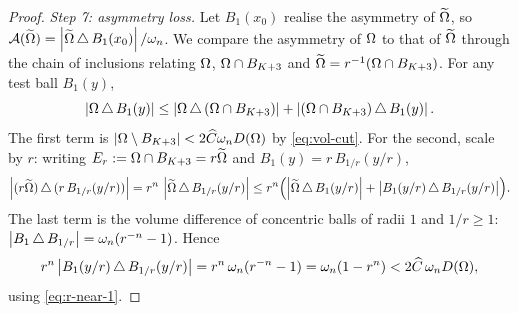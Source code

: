 \begin{proof}
\smallskip
\emph{Step 7: asymmetry loss.}
Let $B_1(x_0)$ realise the asymmetry of $\widetilde{\Omega}$, so
$\mathcal A(\widetilde{\Omega})=\left|\widetilde{\Omega}\,\triangle\,B_1(x_0)\right|/\omega_n$. We compare the
asymmetry of $\Omega$ to that of $\widetilde{\Omega}$ through the chain of inclusions
relating $\Omega$, $\Omega\cap B_{K+3}$ and $\widetilde{\Omega}=r^{-1}(\Omega\cap B_{K+3})$.
For any test ball $B_1(y)$,
\[
   \left|\Omega\,\triangle\,B_1(y)\right|
   \le\left|\Omega\,\triangle\,(\Omega\cap B_{K+3})\right|
     +\left|(\Omega\cap B_{K+3})\,\triangle\,B_1(y)\right|.
\]
The first term is $\left|\Omega\setminus B_{K+3}\right|<2\widehat C\omega_n D(\Omega)$
by \eqref{eq:vol-cut}.
For the second, scale by $r$: writing
$E_r:=\Omega\cap B_{K+3}=r\widetilde{\Omega}$ and $B_1(y)=r\,B_{1/r}(y/r)$,
\[
   \left|(r\widetilde{\Omega})\,\triangle\,(r\,B_{1/r}(y/r))\right|
   =r^n\,\left|\widetilde{\Omega}\,\triangle\,B_{1/r}(y/r)\right|
   \le r^n\Bigl(\left|\widetilde{\Omega}\,\triangle\,B_1(y/r)\right|
              +\left|B_1(y/r)\,\triangle\,B_{1/r}(y/r)\right|\Bigr).
\]
The last term is the volume difference of concentric balls of radii $1$
and $1/r\ge1$:
$\left|B_1\,\triangle\,B_{1/r}\right|=\omega_n(r^{-n}-1)$. Hence
\[
   r^n\left|B_1(y/r)\,\triangle\,B_{1/r}(y/r)\right|
   =r^n\,\omega_n(r^{-n}-1)=\omega_n(1-r^n)
   <2\widehat C\,\omega_n D(\Omega),
\]
using \eqref{eq:r-near-1}.

\end{proof}
